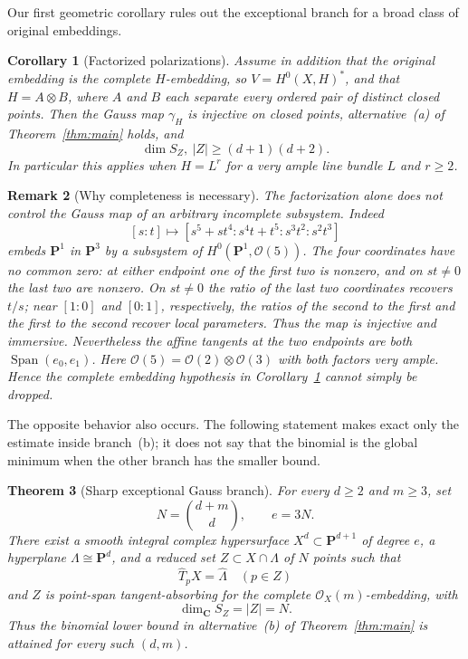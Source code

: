 \documentclass[11pt]{article}
\newtheorem{theorem}{Theorem}[section]
\newtheorem{corollary}[theorem]{Corollary}
\newtheorem{remark}[theorem]{Remark}
\newcommand{\PP}{\mathbf P}
\newcommand{\CC}{\mathbf C}
\newcommand{\cO}{\mathcal O}
\newcommand{\Span}{\operatorname{Span}}
\begin{document}
Our first geometric corollary rules out the exceptional branch for a broad
class of original embeddings.

\begin{corollary}[Factorized polarizations]\label{cor:factorized}
Assume in addition that the original embedding is the complete $H$-embedding,
so $V=H^0(X,H)^*$, and that $H=A\otimes B$, where $A$ and $B$ each separate
every ordered pair of distinct closed points.  Then the Gauss map $\gamma_H$ is
injective on closed points, alternative~\textup{(a)} of
Theorem~\ref{thm:main} holds, and
\[
 \dim S_Z,\ |Z|\geq(d+1)(d+2).
\]
In particular this applies when $H=L^r$ for a very ample line bundle $L$ and
$r\geq2$.
\end{corollary}

\begin{remark}[Why completeness is necessary]\label{rem:incomplete-counterexample}
The factorization alone does not control the Gauss map of an arbitrary
incomplete subsystem.  Indeed
\[
 [s:t]\longmapsto
 [s^5+st^4:s^4t+t^5:s^3t^2:s^2t^3]
\]
embeds $\PP^1$ in $\PP^3$ by a subsystem of $H^0(\PP^1,\cO(5))$.
The four coordinates have no common zero: at either endpoint one of the first
two is nonzero, and on $st\ne0$ the last two are nonzero.
On $st\ne0$ the ratio of the last two coordinates recovers $t/s$; near
$[1:0]$ and $[0:1]$, respectively, the ratios of the second to the first and
the first to the second recover local parameters.  Thus the map is injective
and immersive.  Nevertheless the affine tangents at the two endpoints are
both $\Span(e_0,e_1)$.  Here
$\cO(5)=\cO(2)\otimes\cO(3)$ with both factors very ample.  Hence the complete
embedding hypothesis in Corollary~\ref{cor:factorized} cannot simply be
dropped.
\end{remark}

The opposite behavior also occurs.  The following statement makes exact only
the estimate inside branch~\textup{(b)}; it does not say that the binomial is
the global minimum when the other branch has the smaller bound.

\begin{theorem}[Sharp exceptional Gauss branch]\label{thm:sharp-gauss}
For every $d\geq2$ and $m\geq3$, set
\[
 N=\binom{d+m}{d},\qquad e=3N.
\]
There exist a smooth integral complex hypersurface
$X^d\subset\PP^{d+1}$ of degree $e$, a hyperplane
$\Lambda\cong\PP^d$, and a reduced set $Z\subset X\cap\Lambda$ of $N$
points such that
\[
 \widehat T_pX=\widehat\Lambda\quad(p\in Z)
\]
and $Z$ is point-span tangent-absorbing for the complete
$\cO_X(m)$-embedding, with
\[
 \dim_{\CC}S_Z=|Z|=N.
\]
Thus the binomial lower bound in alternative~\textup{(b)} of
Theorem~\ref{thm:main} is attained for every such $(d,m)$.
\end{theorem}
\end{document}
